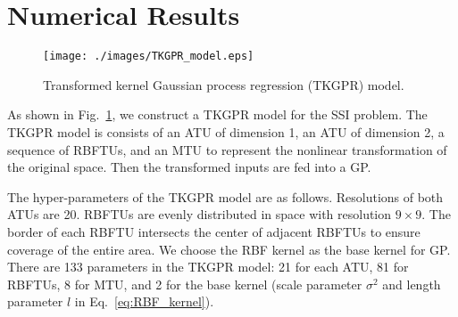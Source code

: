 \documentclass[journal, oneside, twocolumn]{IEEEtran}
\begin{document}
\section{Numerical Results}
\begin{figure}[!tb]
  \centering
  \texttt{[image: ./images/TKGPR\_model.eps]}
  \caption{Transformed kernel Gaussian process regression (TKGPR) model.}
  \label{fig:tkgpr_model}
\end{figure}

As shown in Fig.~\ref{fig:tkgpr_model}, we construct a TKGPR model for the SSI problem. The TKGPR model is consists of an ATU of dimension 1, an ATU of dimension 2, a sequence of RBFTUs, and an MTU to represent the nonlinear transformation of the original space. Then the transformed inputs are fed into a GP. 

The hyper-parameters of the TKGPR model are as follows. Resolutions of both ATUs are 20. RBFTUs are evenly distributed in space with resolution $9\times9$. The border of each RBFTU intersects the center of adjacent RBFTUs to ensure coverage of the entire area. We choose the RBF kernel as the base kernel for GP. There are 133 parameters in the TKGPR model: 21 for each ATU, 81 for RBFTUs, 8 for MTU, and 2 for the base kernel (scale parameter $\sigma^2$ and length parameter $l$ in Eq.~\eqref{eq:RBF_kernel}). 
\end{document}
